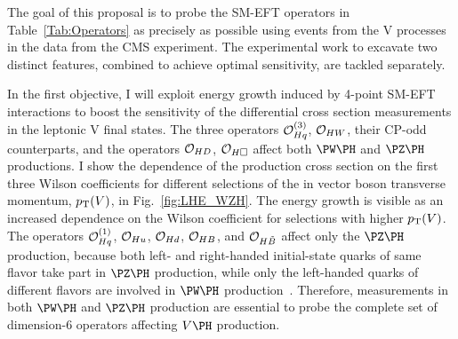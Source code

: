 \documentclass[a4paper,11pt]{article}
\renewcommand{\PV}{{{{V}}}\xspace}
\newcommand{\VH}{{{\PV}{\PH}}\xspace}
\begin{document}
The goal of this proposal is to probe the SM-EFT operators in Table~\ref{Tab:Operators}  as precisely as possible using events from the \VH processes in the data from the CMS experiment. 
The experimental work to excavate two distinct features, combined to achieve optimal sensitivity, are tackled separately.

In the first objective, I will exploit energy growth induced by 4-point SM-EFT interactions to boost the sensitivity of the differential cross section measurements in the leptonic \VH final states.
The three operators ${\cal O}^{(3)}_{Hq}$, ${\cal O}_{HW}$, their CP-odd counterparts, and the operators ${\cal O}_{HD}$, ${\cal O}_{H\square}$ affect both $\PW\PH$ and $\PZ\PH$ productions. 
I show the dependence of the production cross section on the first three Wilson coefficients for different selections of the in vector boson transverse momentum, $\pt(\PV)$, in Fig.~\ref{fig:LHE_WZH}. 
The energy growth is visible as an increased dependence on the Wilson coefficient for selections with higher $\pt(\PV)$. %
The operators ${\cal O}^{(1)}_{Hq}$, ${\cal O}_{Hu}$, ${\cal O}_{Hd}$, ${\cal O}_{HB}$, and ${\cal O}_{H\tilde{B}}$ affect only the $\PZ\PH$ production, 
because both left- and right-handed initial-state quarks of same flavor take part in $\PZ\PH$ production, while only the left-handed quarks of different flavors are involved in $\PW\PH$ production~\cite{Falkowski:2014tna,Banerjee:2018bio}. 
Therefore, measurements in both $\PW\PH$ and $\PZ\PH$ production are essential to probe the complete set of dimension-6 operators affecting $\PV\PH$ production.
\end{document}
